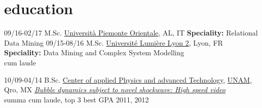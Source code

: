 \documentclass[]{friggeri-cv}
\begin{document}
\begin{entrylist}
%
\end{entrylist}

\section{education}

\begin{entrylist}
	\entry
	{09/16-02/17}
	{M.Sc. \href{http://www.em-dmkm.eu/}
		{}}
	{\href{http://www.uniupo.it/}{Università Piemonte Orientale}, AL, IT}
	{\textbf{Speciality:} Relational Data Mining
	}
	\entry
	{09/15-08/16}
	{M.Sc. \href{http://www.em-dmkm.eu/}
		{}}
	{\href{http://www.univ-lyon2.fr/}{Université Lumière Lyon 2}, Lyon, FR}
	{\textbf{Speciality:} Data Mining and Complex System Modelling \\ cum laude}
	
	\entry
	{10/09-04/14}
	{B.Sc. \href{http://www.fata.unam.mx/tecnologia}
		{}}
	{\href{http://www.fata.unam.mx/}{Center of applied Physics and advanced Technology}, \href{http://www.unam.mx/}{UNAM}, Qro, MX}           
	{\href{https://dl.dropboxusercontent.com/u/2115508/Tesis.pdf}{\emph{Bubble dynamics subject to novel shockwave: High speed video}}\\
		summa cum laude, top 3 best GPA 2011, 2012%
		}
\end{entrylist}
\end{document}
